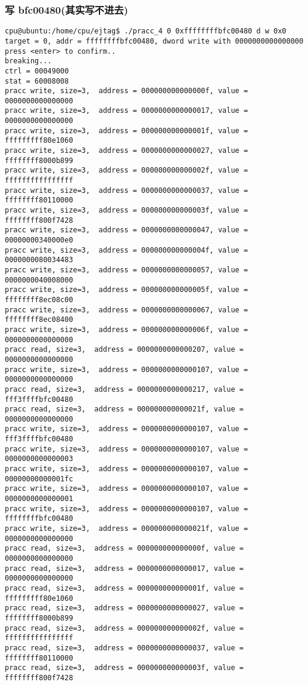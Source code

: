 \subsubsection*{写 bfc00480(其实写不进去)}

\begin{verbatim}
cpu@ubuntu:/home/cpu/ejtag$ ./pracc_4 0 0xffffffffbfc00480 d w 0x0
target = 0, addr = ffffffffbfc00480, dword write with 0000000000000000
press <enter> to confirm..
breaking...
ctrl = 00049000
stat = 60008008
pracc write, size=3,  address = 000000000000000f, value = 0000000000000000
pracc write, size=3,  address = 0000000000000017, value = 0000000000000000
pracc write, size=3,  address = 000000000000001f, value = fffffffff80e1060
pracc write, size=3,  address = 0000000000000027, value = ffffffff8000b899
pracc write, size=3,  address = 000000000000002f, value = ffffffffffffffff
pracc write, size=3,  address = 0000000000000037, value = ffffffff80110000
pracc write, size=3,  address = 000000000000003f, value = ffffffff800f7428
pracc write, size=3,  address = 0000000000000047, value = 00000000340000e0
pracc write, size=3,  address = 000000000000004f, value = 0000000080034483
pracc write, size=3,  address = 0000000000000057, value = 0000000040008000
pracc write, size=3,  address = 000000000000005f, value = ffffffff8ec08c00
pracc write, size=3,  address = 0000000000000067, value = ffffffff8ec08400
pracc write, size=3,  address = 000000000000006f, value = 0000000000000000
pracc read, size=3,  address = 0000000000000207, value = 0000000000000000
pracc write, size=3,  address = 0000000000000107, value = 0000000000000000
pracc read, size=3,  address = 0000000000000217, value = fff3ffffbfc00480
pracc read, size=3,  address = 000000000000021f, value = 0000000000000000
pracc write, size=3,  address = 0000000000000107, value = fff3ffffbfc00480
pracc write, size=3,  address = 0000000000000107, value = 0000000000000003
pracc write, size=3,  address = 0000000000000107, value = 00000000000001fc
pracc write, size=3,  address = 0000000000000107, value = 0000000000000001
pracc write, size=3,  address = 0000000000000107, value = ffffffffbfc00480
pracc write, size=3,  address = 000000000000021f, value = 0000000000000000
pracc read, size=3,  address = 000000000000000f, value = 0000000000000000
pracc read, size=3,  address = 0000000000000017, value = 0000000000000000
pracc read, size=3,  address = 000000000000001f, value = fffffffff80e1060
pracc read, size=3,  address = 0000000000000027, value = ffffffff8000b899
pracc read, size=3,  address = 000000000000002f, value = ffffffffffffffff
pracc read, size=3,  address = 0000000000000037, value = ffffffff80110000
pracc read, size=3,  address = 000000000000003f, value = ffffffff800f7428
\end{verbatim}

